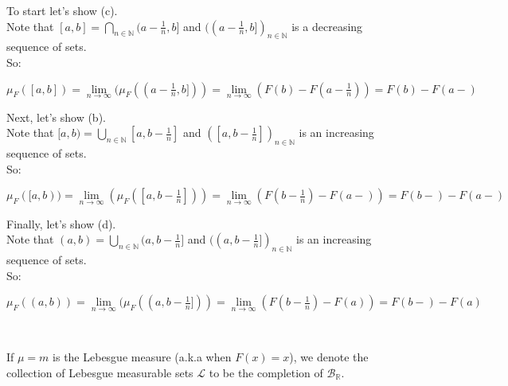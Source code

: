 \documentclass{book}
\newcommand{\hOne}{%
   \color{Black}%
   \fontsize{14}{16}\selectfont%
}
\newcommand{\exTwoP}{%
   \color{RedViolet}%
   \fontsize{13}{15}\selectfont%
}
\newcommand{\exPP}{%
   \color{RedViolet}%
   \fontsize{12}{14}\selectfont%
}
\newenvironment{myIndent}{%
   \begin{adjustwidth}{2.5em}{0em}%
}{%
   \end{adjustwidth}%
}
\newcommand{\mySepTwo}[1][.]{%
   {\noindent\color{#1}{\rule{6.5in}{0.5mm}}}\\%
}
\newcommand{\retTwo}{\hfill\bigbreak}
\begin{document}
\begin{myIndent}\exTwoP
   To start let's show (c).\\ Note that $[a, b] = \bigcap\limits_{n \in \mathbb{N}}(a - \frac{1}{n}, b]$ and $((a - \frac{1}{n}, b])_{n \in \mathbb{N}}$ is a decreasing sequence of sets.\\ [-8pt] So:

   {\centering\exPP $\mu_F([a, b]) = \lim\limits_{n \rightarrow \infty}(\mu_F((a - \frac{1}{n}, b])) = \lim\limits_{n \rightarrow \infty}(F(b) - F(a - \frac{1}{n})) = F(b) - F(a-)$\retTwo\par}

   Next, let's show (b).\\
   Note that $[a, b) = \bigcup\limits_{n \in \mathbb{N}}[a, b - \frac{1}{n}]$ and $([a, b- \frac{1}{n}])_{n \in \mathbb{N}}$ is an increasing sequence of sets.\\ [-8pt] So:

   {\centering\exPP $\mu_F([a, b)) = \lim\limits_{n \rightarrow \infty}(\mu_F([a, b-\frac{1}{n}])) = \lim\limits_{n \rightarrow \infty}(F(b - \frac{1}{n}) - F(a-)) = F(b-) - F(a-)$\retTwo\par}

   Finally, let's show (d).\\
   Note that $(a, b) = \bigcup\limits_{n \in \mathbb{N}}(a, b-\frac{1}{n}]$ and $((a, b- \frac{1}{n}])_{n \in \mathbb{N}}$ is an increasing sequence of sets.\\ [-8pt] So:

   {\centering\exPP $\mu_F((a, b)) = \lim\limits_{n \rightarrow \infty}(\mu_F((a, b-\frac{1}{n}])) = \lim\limits_{n \rightarrow \infty}(F(b - \frac{1}{n}) - F(a)) = F(b-) - F(a)$\retTwo\par}
\end{myIndent}

\mySepTwo\hOne

If $\mu = m$ is the Lebesgue measure (a.k.a when $F(x) = x$), we denote the collection of Lebesgue measurable sets $\mathcal{L}$ to be the completion of $\mathcal{B}_\mathbb{R}$.\retTwo
\end{document}
